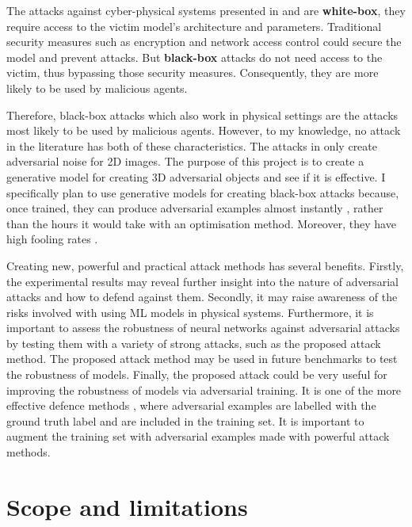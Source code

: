 The attacks against cyber-physical systems presented in \cite{athalye} and \cite{evtimov_road_signs} are \textbf{white-box}, they require access to the victim model's architecture and parameters. Traditional security measures such as encryption and network access control could secure the model and prevent attacks. But \textbf{black-box} attacks do not need access to the victim, thus bypassing those security measures. Consequently, they are more likely to be used by malicious agents. 

Therefore, black-box attacks which also work in physical settings are the attacks most likely to be used by malicious agents. However, to my knowledge, no attack in the literature has both of these characteristics. The attacks in \cite{upset_angri, zheng_black_box_GAN, advGAN} only create adversarial noise for 2D images. The purpose of this project is to create a generative model for creating 3D adversarial objects \cite{athalye} and see if it is effective.  I specifically plan to use generative models for creating black-box attacks because, once trained, they can produce adversarial examples almost instantly \cite{advGAN}, rather than the hours it would take with an optimisation method. Moreover, they have high fooling rates \cite{upset_angri, zheng_black_box_GAN, advGAN}.

Creating new, powerful and practical attack methods has several benefits. Firstly, the experimental results may reveal further insight into the nature of adversarial attacks and how to defend against them. Secondly, it may raise awareness of the risks involved with using ML models in physical systems. Furthermore, it is important to assess the robustness of neural networks against adversarial attacks by testing them with a variety of strong attacks, such as the proposed attack method. The proposed attack method may be used in future benchmarks to test the robustness of models. Finally, the proposed attack could be very useful for improving the robustness of models via adversarial training. It is one of the more effective defence methods \cite{dong2020benchmarking}, where adversarial examples are labelled with the ground truth label and are included in the training set. It is important to augment the training set with adversarial examples made with powerful attack methods.

\section{Scope and limitations}
    \label{sec:scope_limitations}
    
